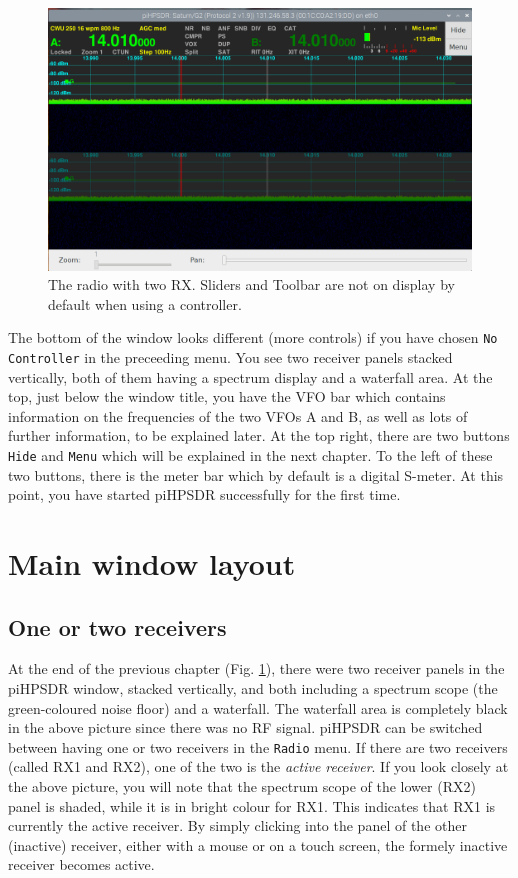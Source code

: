 \documentclass[12pt]{book}
\def\rett#1{\texttt{\color{red}#1}}
\begin{document}
\begin{figure}
\center
\includegraphics[width=12cm]{FirstDisplay.png}
\caption{The radio with two RX. Sliders and Toolbar are not on display
by default when using a controller.}
\label{fig:FirstDisplay}
\end{figure}

The bottom of the window looks different (more controls) if you have chosen \rett{No Controller} in the
preceeding menu.
You see two receiver panels stacked vertically, both of them having a spectrum display and a waterfall area.
At the top,
just below the window title, you have the VFO bar which contains information on the frequencies of the two
VFOs A and B,
as well as lots of further information, to be explained later. At the top right, there are two buttons
\rett{Hide}
and \rett{Menu} which will be explained in the next chapter. To the left of these two buttons, there is the
meter bar which by default is a digital S-meter. At this point, you have started piHPSDR successfully for
the first time.

\chapter{Main window layout}

\section{One or two receivers}
At the end of the previous chapter (Fig. \ref{fig:FirstDisplay}),
 there were two receiver panels in the
piHPSDR window, stacked vertically, and both including a spectrum scope
(the green-coloured noise floor) and a waterfall. The waterfall area
is completely black in the above picture since there was no RF signal.
piHPSDR can be switched between having one or two receivers in the
\texttt{Radio} menu. If there are two receivers (called RX1 and RX2),
 one of the two is the \textit{active receiver}. If you look closely
 at the above picture, you will note that the spectrum scope of
 the lower (RX2) panel is shaded, while it is in bright colour for RX1.
 This indicates that RX1 is currently the active receiver. By simply
 clicking into the panel of the other (inactive) receiver, either with
 a mouse or on a touch screen, the formely inactive receiver becomes
 active.
\end{document}
